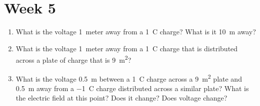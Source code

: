 \section*{Week 5}
\begin{enumerate}
\setlength\itemsep{2 in}
\setcounter{enumi}{\value{counter}}
\item What is the voltage \SI{1}{meter} away from a \SI{1}{\coulomb} charge? What is it \SI{10}{\meter} away?

\item What is the voltage \SI{1}{meter} away from a \SI{1}{\coulomb} charge that is distributed across a plate of charge that is \SI{9}{m^2}? 

\item What is the voltage \SI{0.5}{\meter}  between a \SI{1}{\coulomb} charge across a \SI{9}{\meter^2} plate and \SI{0.5}{\meter} away from a \SI{-1}{\coulomb} charge distributed across a similar plate? What is the electric field at this point? Does it change? Does voltage change?

\setcounter{counter}{\value{enumi}}
\end{enumerate}

\vspace{2in}
